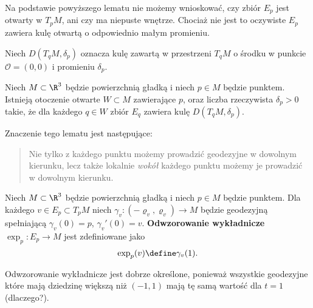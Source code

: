 \begin{frame}
Na podstawie powyższego lematu nie możemy wnioskować, czy zbiór $E_p$ jest otwarty w $T_pM$, ani czy ma niepuste wnętrze. Chociaż nie jest to oczywiste $E_p$ zawiera kulę otwartą o odpowiednio małym promieniu. 
\pause \begin{lemat}
Niech $D(T_qM,\delta_p)$ oznacza kulę zawartą w przestrzeni $T_qM$ o środku w punkcie $\mathcal{O}=(0,0)$ i promieniu $\delta_p$. 

\pause Niech $M\subset \R^3$ będzie powierzchnią gładką i niech $p\in M$ będzie punktem. Istnieją otoczenie otwarte $W\subset M$ zawierające $p$, oraz liczba rzeczywista $\delta_p>0$ takie, że dla każdego $q\in W$ zbiór $E_q$ zawiera kulę $D(T_qM,\delta_p)$.
\end{lemat}
\end{frame}
\begin{frame}

\begin{uwaga}
Znaczenie tego lematu jest następujące: 
\begin{quote}
Nie tylko z każdego punktu możemy prowadzić geodezyjne w dowolnym kierunku, lecz także lokalnie \textit{wokół} 
każdego punktu możemy je prowadzić w dowolnym kierunku. 
\end{quote}

\end{uwaga}


\end{frame}
\begin{frame}

\begin{definicja}
Niech $M\subset \R^3$ będzie powierzchnią gładką i niech $p\in M$ będzie punktem. Dla każdego $v\in E_p\subset T_pM$ niech $\gamma_v\colon(-\varrho_v,\varrho_v)\to M$ będzie geodezyjną spełniającą $\gamma_v(0)=p$, $\gamma_v'(0)=v$. \pause \textbf{Odwzorowanie wykładnicze} $\exp_p\colon E_p \to M$ jest zdefiniowane jako
\[\exp_p(v)\define\gamma_v(1).\]
\end{definicja}

\pause\begin{uwaga}
Odwzorowanie wykładnicze jest dobrze określone, ponieważ wszystkie geodezyjne które mają dziedzinę większą niż $(-1,1)$ mają tę samą wartość dla $t=1$ (dlaczego?).
\end{uwaga}

\end{frame}

